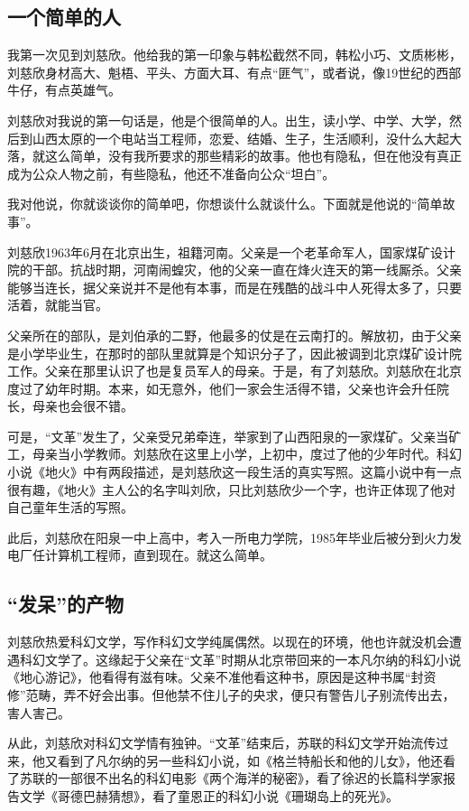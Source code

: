 \documentclass[fontset=fandol,12pt,a5paper]{ctexbook}
\begin{document}
\subsection{一个简单的人}

我第一次见到刘慈欣。他给我的第一印象与韩松截然不同，韩松小巧、文质彬彬，刘慈欣身材高大、魁梧、平头、方面大耳、有点“匪气”，或者说，像19世纪的西部牛仔，有点英雄气。

刘慈欣对我说的第一句话是，他是个很简单的人。出生，读小学、中学、大学，然后到山西太原的一个电站当工程师，恋爱、结婚、生子，生活顺利，没什么大起大落，就这么简单，没有我所要求的那些精彩的故事。他也有隐私，但在他没有真正成为公众人物之前，有些隐私，他还不准备向公众“坦白”。

我对他说，你就谈谈你的简单吧，你想谈什么就谈什么。下面就是他说的“简单故事”。

刘慈欣1963年6月在北京出生，祖籍河南。父亲是一个老革命军人，国家煤矿设计院的干部。抗战时期，河南闹蝗灾，他的父亲一直在烽火连天的第一线厮杀。父亲能够当连长，据父亲说并不是他有本事，而是在残酷的战斗中人死得太多了，只要活着，就能当官。

父亲所在的部队，是刘伯承的二野，他最多的仗是在云南打的。解放初，由于父亲是小学毕业生，在那时的部队里就算是个知识分子了，因此被调到北京煤矿设计院工作。父亲在那里认识了也是复员军人的母亲。于是，有了刘慈欣。刘慈欣在北京度过了幼年时期。本来，如无意外，他们一家会生活得不错，父亲也许会升任院长，母亲也会很不错。

可是，“文革”发生了，父亲受兄弟牵连，举家到了山西阳泉的一家煤矿。父亲当矿工，母亲当小学教师。刘慈欣在这里上小学，上初中，度过了他的少年时代。科幻小说《地火》中有两段描述，是刘慈欣这一段生活的真实写照。这篇小说中有一点很有趣，《地火》主人公的名字叫刘欣，只比刘慈欣少一个字，也许正体现了他对自己童年生活的写照。

此后，刘慈欣在阳泉一中上高中，考入一所电力学院，1985年毕业后被分到火力发电厂任计算机工程师，直到现在。就这么简单。

\subsection{“发呆”的产物}

刘慈欣热爱科幻文学，写作科幻文学纯属偶然。以现在的环境，他也许就没机会遭遇科幻文学了。这缘起于父亲在“文革”时期从北京带回来的一本凡尔纳的科幻小说《地心游记》，他看得有滋有味。父亲不准他看这种书，原因是这种书属“封资修”范畴，弄不好会出事。但他禁不住儿子的央求，便只有警告儿子别流传出去，害人害己。

从此，刘慈欣对科幻文学情有独钟。“文革”结束后，苏联的科幻文学开始流传过来，他又看到了凡尔纳的另一些科幻小说，如《格兰特船长和他的儿女》，他还看了苏联的一部很不出名的科幻电影《两个海洋的秘密》，看了徐迟的长篇科学家报告文学《哥德巴赫猜想》，看了童恩正的科幻小说《珊瑚岛上的死光》。
\end{document}
